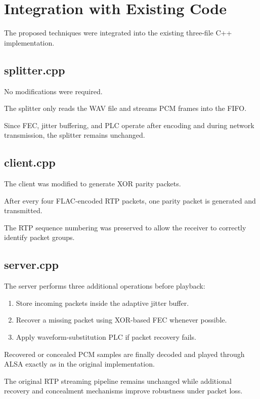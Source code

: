 \documentclass[conference]{IEEEtran}
\begin{document}
\section{Integration with Existing Code}

The proposed techniques were integrated into the existing three-file C++ implementation.

\subsection{splitter.cpp}

No modifications were required.

The splitter only reads the WAV file and streams PCM frames into the FIFO.

Since FEC, jitter buffering, and PLC operate after encoding and during network transmission, the splitter remains unchanged.

\subsection{client.cpp}

The client was modified to generate XOR parity packets.

After every four FLAC-encoded RTP packets, one parity packet is generated and transmitted.

The RTP sequence numbering was preserved to allow the receiver to correctly identify packet groups.

\subsection{server.cpp}

The server performs three additional operations before playback:

\begin{enumerate}
\item Store incoming packets inside the adaptive jitter buffer.
\item Recover a missing packet using XOR-based FEC whenever possible.
\item Apply waveform-substitution PLC if packet recovery fails.
\end{enumerate}

Recovered or concealed PCM samples are finally decoded and played through ALSA exactly as in the original implementation.

The original RTP streaming pipeline remains unchanged while additional recovery and concealment mechanisms improve robustness under packet loss.
\end{document}
